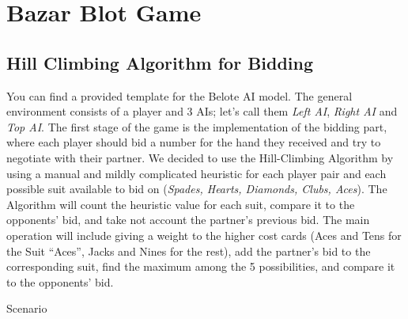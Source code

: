 \section{Bazar Blot Game}\label{ModelDescription}
\subsection{Hill Climbing Algorithm for Bidding}
\hspace{\parindent}You can find a provided template for the Belote AI model.
The general environment consists of a player and 3 AIs; let’s call them \textit{Left
AI}, \textit{Right AI} and \textit{Top AI}. The first stage of the game is the implementation of
the bidding part, where each player should bid a number for the hand they received
and try to negotiate with their partner. We decided to use the Hill-Climbing Algorithm by
using a manual and mildly complicated heuristic for each player pair and each
possible suit available to bid on (\textit{Spades, Hearts, Diamonds, Clubs, Aces}). The
Algorithm will count the heuristic value for each suit, compare it to the opponents’
bid, and take not account the partner’s previous bid. The main operation will include
giving a weight to the higher cost cards (Aces and Tens for the Suit “Aces”, Jacks and
Nines for the rest), add the partner’s bid to the corresponding suit, find the maximum
among the 5 possibilities, and compare it to the opponents’ bid.
\par Scenario


